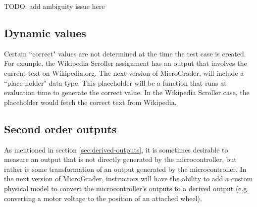 \documentclass[12pt]{article}
\begin{document}
TODO: add ambiguity issue here




\subsection{Dynamic values}
Certain ``correct" values are not determined at the time the test case is created.  For example, the Wikipedia Scroller assignment has an output that involves the current text on Wikipedia.org.  The next version of MicroGrader, will include a ``place-holder" data type.  This placeholder will be a function that runs at evaluation time to generate the correct value.  In the Wikipedia Scroller case, the placeholder would fetch the correct text from Wikipedia.

\subsection{Second order outputs}
As mentioned in section \ref{sec:derived-outputs}, it is sometimes desirable to measure an output that is not directly generated by the microcontroller, but rather is some transformation of an output generated by the microcontroller.  In the next version of MicroGrader, instructors will have the ability to add a custom physical model to convert the microcontroller's outputs to a derived output (e.g. converting a motor voltage to the position of an attached wheel).
\end{document}
